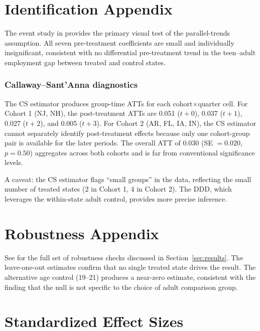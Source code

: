 \documentclass[12pt]{article}
\begin{document}
\section{Identification Appendix}
\label{app:identification}

The event study in  provides the primary visual test of the parallel-trends assumption. All seven pre-treatment coefficients are small and individually insignificant, consistent with no differential pre-treatment trend in the teen--adult employment gap between treated and control states.

\subsubsection*{Callaway--Sant'Anna diagnostics} The CS estimator produces group-time ATTs for each cohort$\times$quarter cell. For Cohort 1 (NJ, NH), the post-treatment ATTs are 0.051 ($t+0$), 0.037 ($t+1$), 0.027 ($t+2$), and 0.005 ($t+3$). For Cohort 2 (AR, FL, IA, IN), the CS estimator cannot separately identify post-treatment effects because only one cohort-group pair is available for the later periods. The overall ATT of 0.030 (SE $= 0.020$, $p = 0.50$) aggregates across both cohorts and is far from conventional significance levels.

A caveat: the CS estimator flags ``small groups'' in the data, reflecting the small number of treated states (2 in Cohort 1, 4 in Cohort 2). The DDD, which leverages the within-state adult control, provides more precise inference.

\section{Robustness Appendix}
\label{app:robustness}

See  for the full set of robustness checks discussed in Section~\ref{sec:results}. The leave-one-out estimates confirm that no single treated state drives the result. The alternative age control (19--21) produces a near-zero estimate, consistent with the finding that the null is not specific to the choice of adult comparison group.

\section{Standardized Effect Sizes}
\label{sec:sde}


\end{document}
